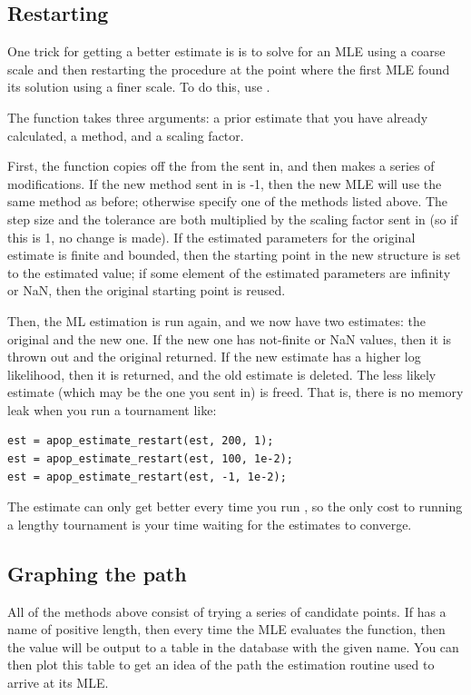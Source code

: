 \subsection{Restarting} 
\label{restart} One trick for getting a better estimate is is to solve
for an MLE using a coarse scale and then restarting the procedure at
the point where the first MLE found its solution using a finer scale.
To do this, use .

The function takes three arguments: a prior estimate that you have
already calculated, a method, and a scaling factor. 

First, the function copies off the 
from the  sent in, and then makes a series of
modifications.  If the new method sent in is -1, then the new MLE will
use the same method as before; otherwise specify one of the methods
listed above. The step size and the tolerance are both multiplied by the
scaling factor sent in (so if this is 1, no change is made). If the
estimated parameters for the original estimate is finite and bounded, then 
the starting point in the new 
structure is set to the estimated value; if some element of the
estimated parameters are infinity or NaN, then the original starting
point is reused.

Then, the ML estimation is run again, and we now have two estimates: the
original and the new one. If the new one has not-finite or NaN values,
then it is thrown out and the original returned. If the new estimate 
has a higher log likelihood, then it is returned, and the old estimate
is deleted.  The less likely estimate (which may be the one you sent in) is freed. That is,
there is no memory leak when you run a tournament like:
\begin{lstlisting}
est = apop_estimate_restart(est, 200, 1);
est = apop_estimate_restart(est, 100, 1e-2);
est = apop_estimate_restart(est, -1, 1e-2);
\end{lstlisting}
The estimate can only get better every time you run
, so the only cost to running a lengthy
tournament is your time waiting for the estimates to converge.

\subsection{Graphing the path} All of the methods above consist of
trying a series of candidate points. 
If 
has a name of positive
length, then every time the MLE evaluates the function, then the value
will be output to a table in the database with the given name. You can
then plot this table to get an idea of the path the estimation routine
used to arrive at its MLE.

